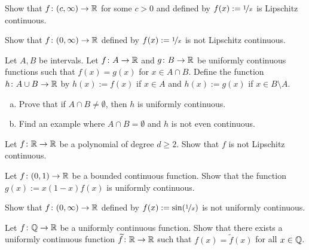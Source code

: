 \begin{exercise}
Show that $f \colon (c,\infty) \to {\mathbb{R}}$ for some $c > 0$
and defined by $f(x) := \nicefrac{1}{x}$ is Lipschitz continuous.
\end{exercise}

\begin{exercise}
Show that $f \colon (0,\infty) \to {\mathbb{R}}$
defined by $f(x) := \nicefrac{1}{x}$ is not Lipschitz continuous.
\end{exercise}

\begin{samepage}
\begin{exercise}
Let $A, B$ be intervals.
Let $f \colon A \to {\mathbb{R}}$ and $g \colon B \to {\mathbb{R}}$ be uniformly continuous
functions such that $f(x) = g(x)$ for $x \in A \cap B$.  Define
the function $h \colon A \cup B \to {\mathbb{R}}$ by $h(x) := f(x)$ if
$x \in A$ and $h(x) := g(x)$ if $x \in B \setminus A$.
\begin{enumerate}[a)]
\item
Prove that if $A \cap B \not= \emptyset$, then $h$ is uniformly continuous.
\item
Find an example where $A \cap B = \emptyset$ and $h$ is not even
continuous.
\end{enumerate}
\end{exercise}
\end{samepage}

\begin{exercise}[Challenging]
Let $f \colon {\mathbb{R}} \to {\mathbb{R}}$ be a polynomial of degree 
$d \geq 2$.  Show that $f$ is not Lipschitz
continuous.
\end{exercise}

\begin{exercise}
Let $f \colon (0,1) \to {\mathbb{R}}$ be a bounded continuous function.  Show that
the function
$g(x) := x(1-x)f(x)$ is uniformly continuous.
\end{exercise}

\begin{exercise}
Show that $f \colon (0,\infty) \to {\mathbb{R}}$ defined by $f(x) := \sin
(\nicefrac{1}{x})$ is not uniformly continuous.
\end{exercise}

\begin{exercise}[Challenging]
Let $f \colon {\mathbb{Q}} \to {\mathbb{R}}$ be a uniformly continuous function.  Show that
there exists a uniformly continuous function $\widetilde{f} \colon {\mathbb{R}} \to {\mathbb{R}}$
such that $f(x) = \widetilde{f}(x)$ for all $x \in {\mathbb{Q}}$.
\end{exercise}

